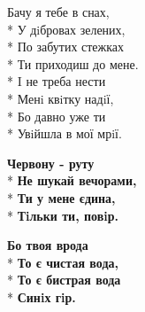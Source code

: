 \medskip

\begin{minipage}{\linewidth}
Бачу я тебе в снах,\\*
У дiбровах зелених,\\*
По забутих стежках\\*
Ти приходиш до мене.\\*
I не треба нести\\*
Менi квiтку надiї,\\*
Бо давно уже ти\\*
Увiйшла в мої мрiї.\\
\end{minipage}\par\medskip\nobreak

\medskip

\begin{minipage}{\linewidth}
\hspace*{1.5em}\textbf{Червону - руту}\\*
\hspace*{1.5em}\textbf{Не шукай вечорами,}\\*
\hspace*{1.5em}\textbf{Ти у мене єдина,}\\*
\hspace*{1.5em}\textbf{Тiльки ти, повiр.}\\
\end{minipage}\par\medskip\nobreak

\medskip

\begin{minipage}{\linewidth}
\hspace*{1.5em}\textbf{Бо твоя врода}\\*
\hspace*{1.5em}\textbf{То є чистая вода,}\\*
\hspace*{1.5em}\textbf{То є бистрая вода}\\*
\hspace*{1.5em}\textbf{Синiх гiр.}\\
\end{minipage}

\vspace{\fill}\newpage

